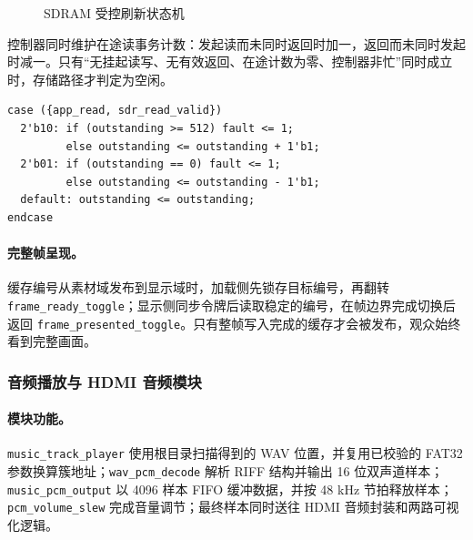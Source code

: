 \begin{figure}[H]\centering
{}
\caption{SDRAM 受控刷新状态机}\label{fig:refresh-fsm}
\end{figure}

控制器同时维护在途读事务计数：发起读而未同时返回时加一，返回而未同时发起时减一。只有“无挂起读写、无有效返回、在途计数为零、控制器非忙”同时成立时，存储路径才判定为空闲。

\begin{lstlisting}[style=Verilog]
case ({app_read, sdr_read_valid})
  2'b10: if (outstanding >= 512) fault <= 1;
         else outstanding <= outstanding + 1'b1;
  2'b01: if (outstanding == 0) fault <= 1;
         else outstanding <= outstanding - 1'b1;
  default: outstanding <= outstanding;
endcase
\end{lstlisting}

\paragraph{完整帧呈现。}缓存编号从素材域发布到显示域时，加载侧先锁存目标编号，再翻转 \texttt{frame\_ready\_toggle}；显示侧同步令牌后读取稳定的编号，在帧边界完成切换后返回 \texttt{frame\_presented\_toggle}。只有整帧写入完成的缓存才会被发布，观众始终看到完整画面。

\subsubsection{音频播放与 HDMI 音频模块}
\paragraph{模块功能。}\texttt{music\_track\_player} 使用根目录扫描得到的 WAV 位置，并复用已校验的 FAT32 参数换算簇地址；\texttt{wav\_pcm\_decode} 解析 RIFF 结构并输出 16 位双声道样本；\texttt{music\_pcm\_output} 以 4096 样本 FIFO 缓冲数据，并按 48 kHz 节拍释放样本；\texttt{pcm\_volume\_slew} 完成音量调节；最终样本同时送往 HDMI 音频封装和两路可视化逻辑。

